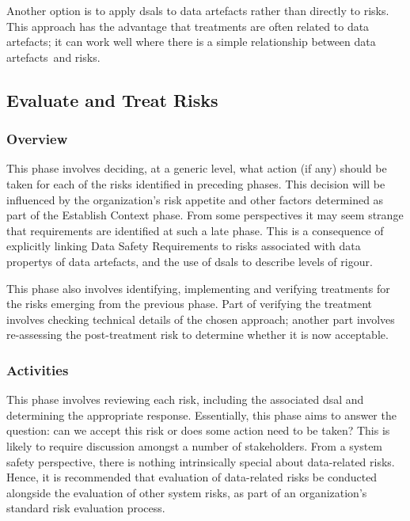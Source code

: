 Another option is to apply \glspl{dsal} to \glspl{data artefact} rather than directly to risks. This approach has the advantage that \glspl{treatment} are often related to \cbstart\glspl{data artefact}\cbend; it can work well where there is a simple relationship between \cbstart\glspl{data artefact}\cbend\ and risks.

\subsection{Evaluate and Treat Risks}
\subsubsection{Overview}
This phase involves deciding, at a generic level, what action (if any) should be taken for each of the risks identified in preceding phases. This decision will be influenced by the organization's risk appetite and other factors determined as part of the Establish Context phase. From some perspectives it may seem strange that requirements are identified at such a late phase. This is a consequence of explicitly linking Data Safety Requirements to risks associated with \glspl{data property} of \glspl{data artefact}, and the use of \glspl{dsal} to describe levels of rigour. 

This phase also involves identifying, implementing and verifying \glspl{treatment} for the risks emerging from the previous phase. Part of verifying the \gls{treatment} involves checking technical details of the chosen approach; another part involves re-assessing the post-\gls{treatment} risk to determine whether it is now acceptable.

\subsubsection{Activities}
This phase involves reviewing each risk, including the associated \gls{dsal} and determining the appropriate \gls{response}. Essentially, this phase aims to answer the question: can we accept this risk or does some action need to be taken? This is likely to require discussion amongst a number of \glspl{stakeholder}. From a system safety perspective, there is nothing intrinsically special about data-related risks. Hence, it is recommended that evaluation of data-related risks be conducted alongside the evaluation of other system risks, as part of an organization's standard risk evaluation process.

